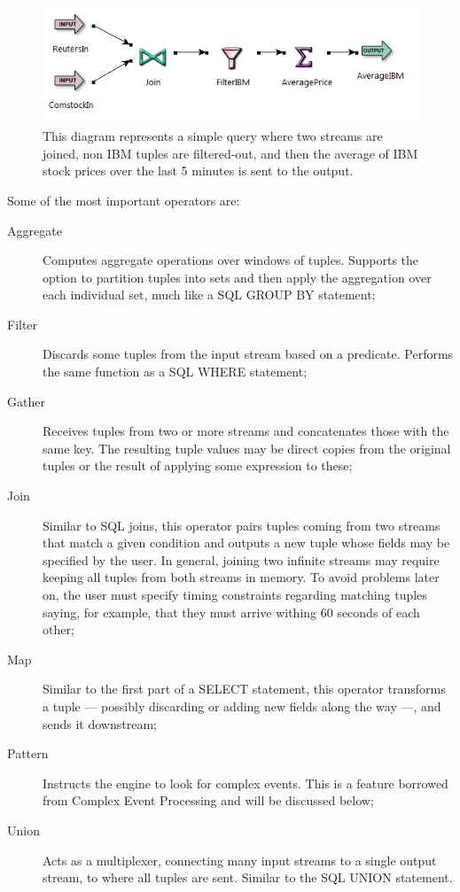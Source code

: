 \documentclass{report}
\begin{document}
\begin{figure}[htbp]
  \centering
  \includegraphics[width=\textwidth]{eventflow.png}
  \caption{This diagram represents a simple query where two streams
    are joined, non IBM tuples are filtered-out, and then the average
    of IBM stock prices over the last 5 minutes is sent to the
    output.}
  \label{fig:eventflow-sample}
\end{figure}

Some of the most important operators are:

\begin{description}
\item [Aggregate] Computes aggregate operations over windows of
  tuples. Supports the option to partition tuples into sets and then
  apply the aggregation over each individual set, much like a SQL
  GROUP BY statement;
\item [Filter] Discards some tuples from the input stream based on a
  predicate. Performs the same function as a SQL WHERE statement;
\item [Gather] Receives tuples from two or more streams and
  concatenates those with the same key. The resulting tuple values may
  be direct copies from the original tuples or the result of applying
  some expression to these;
\item [Join] Similar to SQL joins, this operator pairs tuples coming
  from two streams that match a given condition and outputs a new
  tuple whose fields may be specified by the user. In general, joining
  two infinite streams may require keeping all tuples from both
  streams in memory. To avoid problems later on, the user must specify
  timing constraints regarding matching tuples saying, for example,
  that they must arrive withing 60 seconds of each other;
\item [Map] Similar to the first part of a SELECT statement, this
  operator transforms a tuple --- possibly discarding or adding new
  fields along the way ---, and sends it downstream;
\item [Pattern] Instructs the engine to look for complex events. This
  is a feature borrowed from Complex Event Processing and will be
  discussed below;
\item [Union] Acts as a multiplexer, connecting many input streams to
  a single output stream, to where all tuples are sent. Similar to the
  SQL UNION statement.
\end{description}
\end{document}
